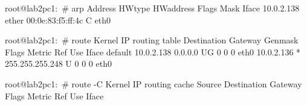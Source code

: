 root@lab2pc1:~# arp
Address                  HWtype  HWaddress           Flags Mask            Iface
10.0.2.138               ether   00:0e:83:f5:ff:4c   C                     eth0


root@lab2pc1:~# route
Kernel IP routing table
Destination     Gateway         Genmask         Flags Metric Ref    Use Iface
default         10.0.2.138      0.0.0.0         UG    0      0        0 eth0
10.0.2.136      *               255.255.255.248 U     0      0        0 eth0


root@lab2pc1:~# route -C
Kernel IP routing cache
Source          Destination     Gateway         Flags Metric Ref    Use Iface
